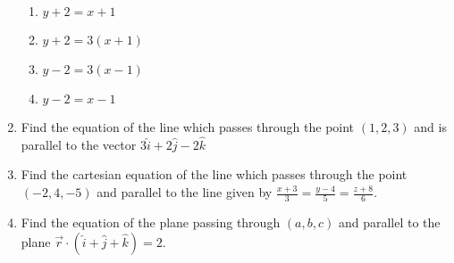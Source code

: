 \begin{enumerate}[label=\thesubsection.\arabic*, ref=\thesubsection.\theenumi]
\begin{enumerate}
\item $y+2=x+1$
\item $y+2=3(x+1)$
\item $y-2=3(x-1)$
\item $y-2=x-1$
\end{enumerate}
\item  Find the equation of the line which passes through the point $(1, 2, 3)$ and is parallel to the vector $3\hat{i}+2\hat{j}-2\hat{k}$
\item Find the cartesian equation of the line which passes through the point $(-2, 4, -5)$ and parallel to the line given by $ \frac{x+3}{3}=\frac{y-4}{5}=\frac{z+8}{6}$.
\item Find the equation of the plane passing through $(a, b, c)$ and parallel to the plane $\overrightarrow{r} \cdot (\hat{i}+\hat{j}+\hat{k})=2$.
\end{enumerate}

